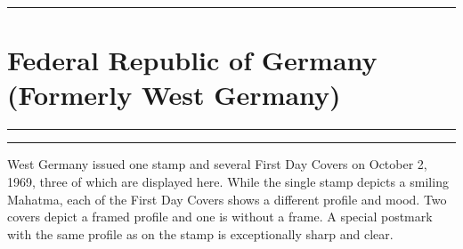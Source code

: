 \documentclass[a4paper]{article}
\begin{document}
  \hrule
\section*{Federal Republic of Germany {\small (Formerly West Germany)}}
\vspace{8pt}
\hrule
\vspace{20cm}
\hfill
\begin{minipage}{8cm} \hrule \vspace{12pt} West Germany issued one
  stamp and several First Day Covers on October 2, 1969, three of
  which are displayed here. While the single stamp depicts a smiling
  Mahatma, each of the First Day Covers shows a different profile and
  mood. Two covers depict a framed profile and one is without a
  frame. A special postmark with the same profile as on the stamp is
  exceptionally sharp and clear.
\end{minipage}

\end{document}
